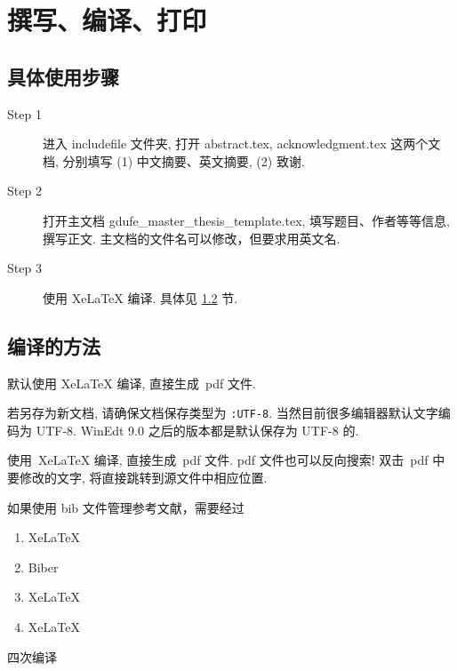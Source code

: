 \chapter{撰写、编译、打印}

\section{具体使用步骤}

\begin{description}

    \item[Step 1]  进入 includefile 文件夹,  打开 abstract.tex, acknowledgment.tex 这两个文档,
          分别填写 (1) 中文摘要、英文摘要, (2) 致谢.

    \item[Step 2]  打开主文档 gdufe\_master\_thesis\_template.tex, 填写题目、作者等等信息, 撰写正文. 主文档的文件名可以修改，但要求用英文名.

    \item[Step 3]  使用 XeLaTeX 编译. 具体见 \ref{sec-compile} 节.

\end{description}

\section{编译的方法}\label{sec-compile}

默认使用 XeLaTeX 编译, 直接生成~pdf 文件.

若另存为新文档, 请确保文档保存类型为 \verb|:UTF-8|. 当然目前很多编辑器默认文字编码为 UTF-8.
WinEdt 9.0 之后的版本都是默认保存为 UTF-8 的.

使用~XeLaTeX 编译, 直接生成~pdf 文件.
pdf 文件也可以反向搜索! 双击~pdf 中要修改的文字, 将直接跳转到源文件中相应位置.

如果使用 bib 文件管理参考文献，需要经过
\begin{enumerate}
    \item XeLaTeX

    \item Biber

    \item XeLaTeX

    \item XeLaTeX
\end{enumerate}
四次编译


